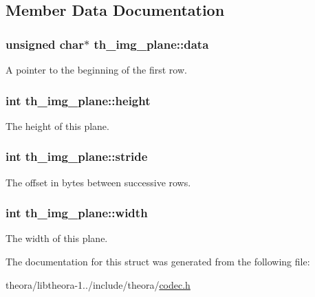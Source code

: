 \subsection{Member Data Documentation}
\hypertarget{structth__img__plane_af8133681516ce88b5a201c1b4b7e6ba2}{
\subsubsection[{data}]{\setlength{\rightskip}{0pt plus 5cm}unsigned char$\ast$ th\+\_\+img\+\_\+plane\+::data}}\label{structth__img__plane_af8133681516ce88b5a201c1b4b7e6ba2}
A pointer to the beginning of the first row. \hypertarget{structth__img__plane_a21aea1367894468de489d529d7eaf44d}{
\subsubsection[{height}]{\setlength{\rightskip}{0pt plus 5cm}int th\+\_\+img\+\_\+plane\+::height}}\label{structth__img__plane_a21aea1367894468de489d529d7eaf44d}
The height of this plane. \hypertarget{structth__img__plane_ab1100f071ffee3b37e07e3222f819bad}{
\subsubsection[{stride}]{\setlength{\rightskip}{0pt plus 5cm}int th\+\_\+img\+\_\+plane\+::stride}}\label{structth__img__plane_ab1100f071ffee3b37e07e3222f819bad}
The offset in bytes between successive rows. \hypertarget{structth__img__plane_a58cc297a99cd4594c3d30e56f2ed6b74}{
\subsubsection[{width}]{\setlength{\rightskip}{0pt plus 5cm}int th\+\_\+img\+\_\+plane\+::width}}\label{structth__img__plane_a58cc297a99cd4594c3d30e56f2ed6b74}
The width of this plane. 

The documentation for this struct was generated from the following file\+:\begin{DoxyCompactItemize}
\item 
theora/libtheora-\/1../include/theora/\hyperlink{theora_2libtheora-1_81_81_2include_2theora_2codec_8h}{codec.\+h}\end{DoxyCompactItemize}
